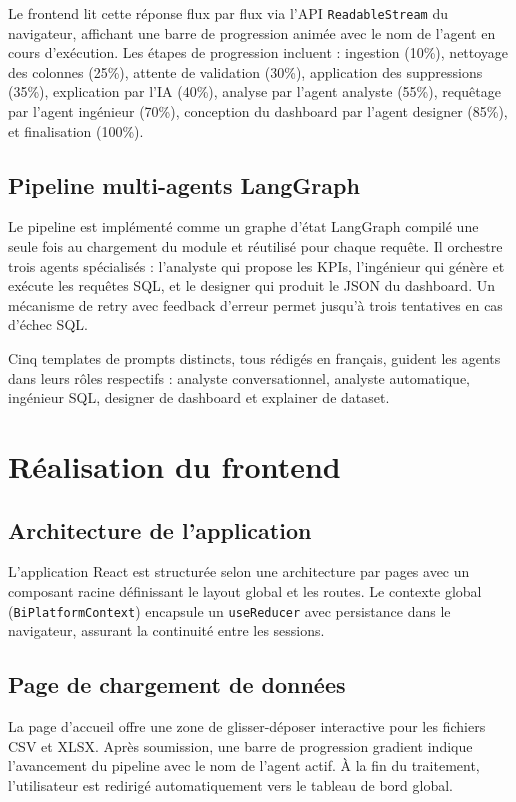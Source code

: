 Le frontend lit cette réponse flux par flux via l'API \texttt{ReadableStream} du navigateur, affichant une barre de progression animée avec le nom de l'agent en cours d'exécution. Les étapes de progression incluent : ingestion (10\%), nettoyage des colonnes (25\%), attente de validation (30\%), application des suppressions (35\%), explication par l'IA (40\%), analyse par l'agent analyste (55\%), requêtage par l'agent ingénieur (70\%), conception du dashboard par l'agent designer (85\%), et finalisation (100\%).

\subsection{Pipeline multi-agents LangGraph}

Le pipeline est implémenté comme un graphe d'état LangGraph compilé une seule fois au chargement du module et réutilisé pour chaque requête. Il orchestre trois agents spécialisés : l'analyste qui propose les KPIs, l'ingénieur qui génère et exécute les requêtes SQL, et le designer qui produit le JSON du dashboard. Un mécanisme de retry avec feedback d'erreur permet jusqu'à trois tentatives en cas d'échec SQL.

Cinq templates de prompts distincts, tous rédigés en français, guident les agents dans leurs rôles respectifs : analyste conversationnel, analyste automatique, ingénieur SQL, designer de dashboard et explainer de dataset.

\section{Réalisation du frontend}

\subsection{Architecture de l'application}

L'application React est structurée selon une architecture par pages avec un composant racine définissant le layout global et les routes. Le contexte global (\texttt{BiPlatformContext}) encapsule un \texttt{useReducer} avec persistance dans le navigateur, assurant la continuité entre les sessions.

\subsection{Page de chargement de données}

La page d'accueil offre une zone de glisser-déposer interactive pour les fichiers CSV et XLSX. Après soumission, une barre de progression gradient indique l'avancement du pipeline avec le nom de l'agent actif. À la fin du traitement, l'utilisateur est redirigé automatiquement vers le tableau de bord global.

